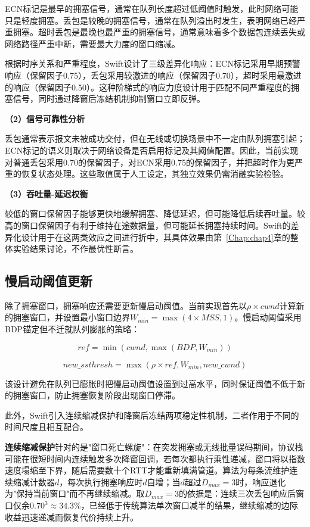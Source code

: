 ECN标记是最早的拥塞信号，通常在队列长度超过低阈值时触发，此时网络可能只是轻度拥塞。丢包是较晚的拥塞信号，通常在队列溢出时发生，表明网络已经严重拥塞。超时丢包是最晚也最严重的拥塞信号，通常意味着多个数据包连续丢失或网络路径严重中断，需要最大力度的窗口缩减。

根据时序关系和严重程度，Swift设计了三级差异化响应：ECN标记采用早期预警响应（保留因子0.75），丢包采用较激进的响应（保留因子0.70），超时采用最激进的响应（保留因子0.50）。这种阶梯式的响应力度设计用于匹配不同严重程度的拥塞信号，同时通过降窗后冻结机制抑制窗口立即反弹。

\textbf{（2）信号可靠性分析}

丢包通常表示报文未被成功交付，但在无线或切换场景中不一定由队列拥塞引起；ECN标记的语义则取决于网络设备是否启用标记及其阈值配置。因此，当前实现对普通丢包采用0.70的保留因子，对ECN采用0.75的保留因子，并把超时作为更严重的恢复状态处理。这些取值属于人工设定，其独立效果仍需消融实验检验。

\textbf{（3）吞吐量-延迟权衡}

较低的窗口保留因子能够更快地缓解拥塞、降低延迟，但可能降低后续吞吐量。较高的窗口保留因子有利于维持在途数据量，但可能延长拥塞持续时间。Swift的差异化设计用于在这两类效应之间进行折中，其具体效果由第~\ref{Chap:chap4}章的整体实验结果讨论，不作最优性断言。

\subsection{慢启动阈值更新}

除了拥塞窗口，拥塞响应还需要更新慢启动阈值。当前实现首先以$\rho \times cwnd$计算新的拥塞窗口，并设置最小窗口边界$W_{min}=\max(4\times MSS,1)$。慢启动阈值采用BDP锚定但不迁就队列膨胀的策略：

\begin{equation}
ref = \min(cwnd, \max(BDP, W_{min}))
\end{equation}

\begin{equation}
new\_ssthresh = \max(\rho \times ref, W_{min}, new\_cwnd)
\end{equation}

该设计避免在队列已膨胀时把慢启动阈值设置到过高水平，同时保证阈值不低于新的拥塞窗口，防止拥塞恢复阶段出现窗口停滞。

此外，Swift引入连续缩减保护和降窗后冻结两项稳定性机制，二者作用于不同的时间尺度且相互配合。

\textbf{连续缩减保护}针对的是"窗口死亡螺旋"：在突发拥塞或无线批量误码期间，协议栈可能在很短时间内连续触发多次降窗回调，若每次都执行乘性递减，窗口将以指数速度塌缩至下界，随后需要数十个RTT才能重新填满管道。算法为每条流维护连续缩减计数器$d$，每次执行拥塞响应时$d$自增；当$d$超过$D_{max} = 3$时，响应退化为"保持当前窗口"而不再继续缩减。取$D_{max} = 3$的依据是：连续三次丢包响应后窗口仅余$0.70^3 \approx 34.3\%$，已经低于传统算法单次窗口减半的结果，继续缩减的边际收益迅速递减而恢复代价持续上升。

